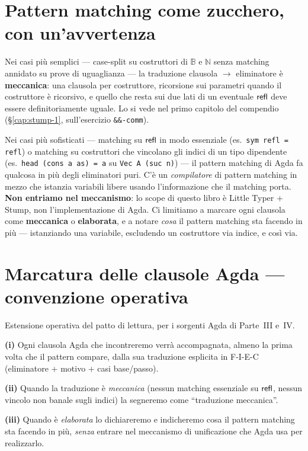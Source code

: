 \section*{Pattern matching come zucchero, con un'avvertenza}

Nei casi pi\`u semplici --- case-split su costruttori di $\mathbb{B}$ e $\mathbb{N}$ senza matching annidato su prove di uguaglianza --- la traduzione clausola $\to$ eliminatore \`e \textbf{meccanica}: una clausola per costruttore, ricorsione sui parametri quando il costruttore \`e ricorsivo, e quello che resta sui due lati di un eventuale $\mathsf{refl}$ deve essere definitoriamente uguale. Lo si vede nel primo capitolo del compendio (\S\ref{cap:stump-1}, sull'esercizio \texttt{\&\&-comm}).

Nei casi pi\`u sofisticati --- matching su $\mathsf{refl}$ in modo essenziale (es.\ \texttt{sym refl = refl}) o matching su costruttori che vincolano gli indici di un tipo dipendente (es.\ \texttt{head (cons a as) = a} su \texttt{Vec A (suc n)}) --- il pattern matching di Agda fa qualcosa in pi\`u degli eliminatori puri. C'\`e un \emph{compilatore} di pattern matching in mezzo che istanzia variabili libere usando l'informazione che il matching porta. \textbf{Non entriamo nel meccanismo}: lo scope di questo libro \`e Little Typer + Stump, non l'implementazione di Agda. Ci limitiamo a marcare ogni clausola come \textbf{meccanica} o \textbf{elaborata}, e a notare \emph{cosa} il pattern matching sta facendo in pi\`u --- istanziando una variabile, escludendo un costruttore via indice, e cos\`i via.

\section*{Marcatura delle clausole Agda --- convenzione operativa}

Estensione operativa del patto di lettura, per i sorgenti Agda di Parte~III e~IV.

\noindent\textbf{(i)} Ogni clausola Agda che incontreremo verr\`a accompagnata, almeno la prima volta che il pattern compare, dalla sua traduzione esplicita in F-I-E-C (eliminatore + motivo + casi base/passo).

\noindent\textbf{(ii)} Quando la traduzione \`e \emph{meccanica} (nessun matching essenziale su $\mathsf{refl}$, nessun vincolo non banale sugli indici) la segneremo come ``traduzione meccanica''.

\noindent\textbf{(iii)} Quando \`e \emph{elaborata} lo dichiareremo e indicheremo cosa il pattern matching sta facendo in pi\`u, \emph{senza} entrare nel meccanismo di unificazione che Agda usa per realizzarlo.


